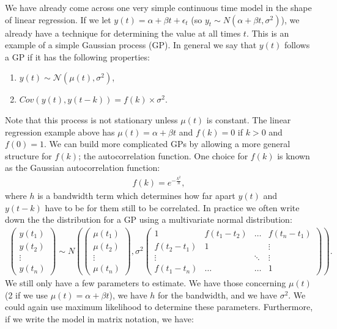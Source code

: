 \documentclass[a4paper,11pt,oneside,onecolumn]{book}
\begin{document}
We have already come across one very simple continuous time model in the shape of linear regression. If we let $y(t) = \alpha+\beta t + \epsilon_t$ (so $y_t \sim N(\alpha+\beta t,\sigma^2)$), we already have a technique for determining the value at all times $t$. This is an example of a simple Gaussian process (GP). In general we say that $y(t)$ follows a GP if it has the following properties:
\begin{enumerate}
\item $y(t) \sim \mathcal{N}(\mu(t),\sigma^2 )$,
\item $Cov(y(t),y(t-k)) = f(k) \times \sigma^2$.
\end{enumerate}
Note that this process is not stationary unless $\mu(t)$ is constant. The linear regression example above has $\mu(t)=\alpha+\beta t$ and $f(k)=0$ if $k>0$ and $f(0)=1$. We can build more complicated GPs by allowing a more general structure for $f(k)$; the autocorrelation function. One choice for $f(k)$ is known as the Gaussian autocorrelation function:
\begin{eqnarray*}
f(k) = e^{-\frac{k^2}{h}},
\end{eqnarray*}
where $h$ is a bandwidth term which determines how far apart $y(t)$ and $y(t-k)$ have to be for them still to be correlated. In practice we often write down the the distribution for a GP using a multivariate normal distribution:
\begin{eqnarray*}
\left( \begin{array}{c} y(t_1) \\ y(t_2) \\ \vdots \\ y(t_n) \end{array} \right ) \sim N \left(
\left( \begin{array}{c} \mu(t_1) \\ \mu(t_2) \\ \vdots \\ \mu(t_n) \end{array} \right), \sigma^2
\left( \begin{array}{cccc}
1 & f(t_1-t_2) & \ldots & f(t_n-t_1) \\
f(t_2-t_1) & 1 & & \vdots\\
\vdots & & \ddots & \vdots \\
f(t_1-t_n) & \ldots & \ldots & 1
\end{array} \right)
\right).
\end{eqnarray*}
We still only have a few parameters to estimate. We have those concerning $\mu(t)$ (2 if we use $\mu(t)=\alpha+\beta t$), we have $h$ for the bandwidth, and we have $\sigma^2$. We could again use maximum likelihood to determine these parameters. Furthermore, if we write the model in matrix notation, we have:
\end{document}
